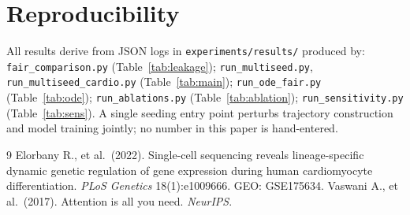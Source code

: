 \documentclass[11pt]{article}
\begin{document}
\section*{Reproducibility}
All results derive from JSON logs in \texttt{experiments/results/} produced by:
\texttt{fair\_comparison.py} (Table~\ref{tab:leakage});
\texttt{run\_multiseed.py}, \texttt{run\_multiseed\_cardio.py} (Table~\ref{tab:main});
\texttt{run\_ode\_fair.py} (Table~\ref{tab:ode});
\texttt{run\_ablations.py} (Table~\ref{tab:ablation});
\texttt{run\_sensitivity.py} (Table~\ref{tab:sens}).
A single seeding entry point perturbs trajectory construction and model training
jointly; no number in this paper is hand-entered.

\begin{thebibliography}{9}
 Elorbany R., et al.\ (2022). Single-cell sequencing reveals
lineage-specific dynamic genetic regulation of gene expression during human
cardiomyocyte differentiation. \emph{PLoS Genetics} 18(1):e1009666. GEO: GSE175634.
 Vaswani A., et al.\ (2017). Attention is all you need.
\emph{NeurIPS}.
\end{thebibliography}
\end{document}
